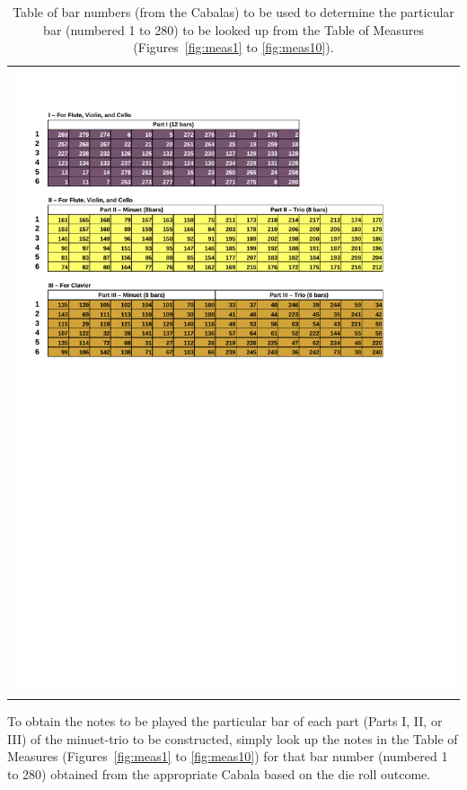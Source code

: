 \documentclass[a4paper,x11names,svgnames,10pt]{article}
\begin{document}
{	
\begin{table}[H]
	\centering
	\begin{tabular}{c}
		\centering
		\includegraphics[clip=true,trim=0.50in 6.25in 1.00in 0.75in,scale=0.90]{000tables}
	\end{tabular}
	\caption{Table of bar numbers (from the Cabalas) to be used to determine the particular bar (numbered 1 to 280) to be looked up from the Table of Measures (Figures~\ref{fig:meas1} to \ref{fig:meas10}).}
	\label{tab:tabNum}
\end{table}

To obtain the notes to be played the particular bar of each part (Parts I, II, or III) of the minuet-trio to be constructed, simply look up the notes in the Table of Measures (Figures~\ref{fig:meas1} to \ref{fig:meas10}) for that bar number (numbered 1 to 280) obtained from the appropriate Cabala based on the die roll outcome.
	
}
\end{document}
